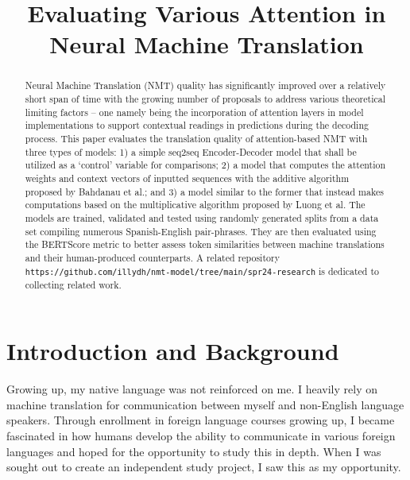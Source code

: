 \documentclass[conference]{IEEEtran}
\begin{document}
\title{Evaluating Various Attention in Neural Machine Translation}
\author{
}
\maketitle


\begin{abstract}
Neural Machine Translation (NMT) quality has significantly improved over a relatively short span of time with the growing number of proposals to address various theoretical limiting factors – one namely being the incorporation of attention layers in model implementations to support contextual readings in predictions during the decoding process. This paper evaluates the translation quality of attention-based NMT with three types of models: 1) a simple seq2seq Encoder-Decoder model that shall be utilized as a ‘control’ variable for comparisons; 2) a model that computes the attention weights and context vectors of inputted sequences with the additive algorithm proposed by Bahdanau et al.; and 3) a model similar to the former that instead makes computations based on the multiplicative algorithm proposed by Luong et al. The models are trained, validated and tested using randomly generated splits from a data set compiling numerous Spanish-English pair-phrases. They are then evaluated using the BERTScore metric to better assess token similarities between machine translations and their human-produced counterparts. A
related repository \nolinkurl{https://github.com/illydh/nmt-model/tree/main/spr24-research} is dedicated to collecting
related work.
\end{abstract}

\section{Introduction and Background}
Growing up, my native language was not reinforced on me. I heavily rely on machine translation for communication between myself and non-English language speakers. Through enrollment in foreign language courses growing up, I became fascinated in how humans develop the ability to communicate in various foreign languages and hoped for the opportunity to study this in depth. When I was sought out to create an independent study project, I saw this as my opportunity.

\par
\end{document}
